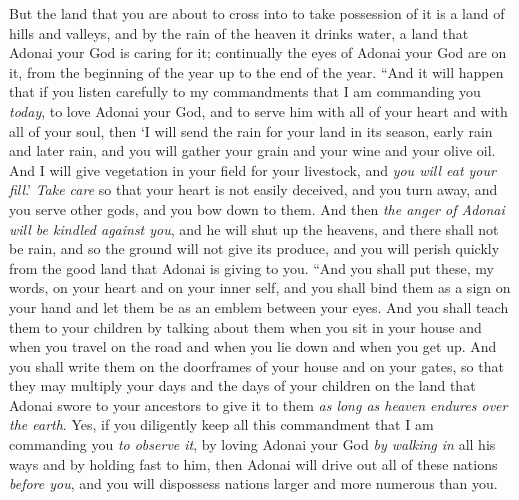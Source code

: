 \begin{biblechapter}
\verse But the land that you are about to cross into to take possession of it is a land of hills and valleys, and by the rain of the heaven it drinks water,
\verse a land that Adonai your God is caring for it; continually the eyes of Adonai your God are on it, from the beginning of the year up to the end of the year.
\verse “And it will happen that if you listen carefully to my commandments that I am commanding you \textit{today}, to love Adonai your God, and to serve him with all of your heart and with all of your soul,
\verse then ‘I will send the rain for your land in its season, early rain and later rain, and you will gather your grain and your wine and your olive oil.
\verse And I will give vegetation in your field for your livestock, and \textit{you will eat your fill}.’
\verse \textit{Take care} so that your heart is not easily deceived, and you turn away, and you serve other gods, and you bow down to them.
\verse And then \textit{the anger of Adonai will be kindled against you}, and he will shut up the heavens, and there shall not be rain, and so the ground will not give its produce, and you will perish quickly from the good land that Adonai is giving to you.
\verse “And you shall put these, my words, on your heart and on your inner self, and you shall bind them as a sign on your hand and let them be as an emblem between your eyes.
\verse And you shall teach them to your children by talking about them when you sit in your house and when you travel on the road and when you lie down and when you get up.
\verse And you shall write them on the doorframes of your house and on your gates,
\verse so that they may multiply your days and the days of your children on the land that Adonai swore to your ancestors to give it to them \textit{as long as heaven endures over the earth}.
\verse Yes, if you diligently keep all this commandment that I am commanding you \textit{to observe it},  by loving Adonai your God \textit{by walking in} all his ways and by holding fast to him,
\verse then Adonai will drive out all of these nations \textit{before you}, and you will dispossess nations larger and more numerous than you.

\end{biblechapter}
